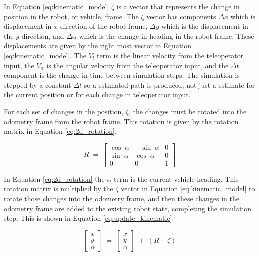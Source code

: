 \documentclass[12pt]{report}
\begin{document}
In Equation \ref{eq:kinematic_model} $\zeta$ is a vector that represents the change in position in the robot, or vehicle, frame.  The $\zeta$ vector has components $\Delta x$ which is displacement in $x$ direction of the robot frame, $\Delta y$ which is the displacement in the $y$ direction, and $\Delta \alpha$ which is the change in heading in the robot frame.  These displacements are given by the right most vector in Equation \ref{eq:kinematic_model}.  The $V_{l}$ term is the linear velocity from the teleoperator input, the $V_{\alpha}$ is the angular velocity from the teleoperator input, and the $\Delta t$ component is the change in time between simulation steps.  The simulation is stepped by a constant $\Delta t$ so a estimated path is produced, not just a estimate for the current position or for each change in teleoperator input.

For each set of changes in the position, $\zeta$, the changes must be rotated into the odometry frame from the robot frame.  This rotation is given by the rotation matrix in Equation \ref{eq:2d_rotation}.

\begin{equation} \label{eq:2d_rotation}
R \; =\; \left[ \begin{array}{ccc} \cos \; \alpha  & -\sin \; \alpha  & 0 \\ \sin \; \alpha  & \cos \; \alpha  & 0 \\ 0 & 0 & 1 \end{array} \right]
\end{equation}

In Equation \ref{eq:2d_rotation} the $\alpha$ term is the current vehicle heading.  This rotation matrix is multiplied by the $\zeta$ vector in Equation \ref{eq:kinematic_model} to rotate those changes into the odometry frame, and then these changes in the odometry frame are added to the existing robot state, completing the simulation step.  This is shown in Equation \ref{eq:update_kinematic}.

\begin{equation} \label{eq:update_kinematic}
\left[ \begin{array}{c} x \\ y \\ \alpha  \end{array} \right]\; =\; \left[ \begin{array}{c} x \\ y \\ \alpha  \end{array} \right]\; +\; \left( R\; \cdot \; \zeta  \right)
\end{equation}
\end{document}
